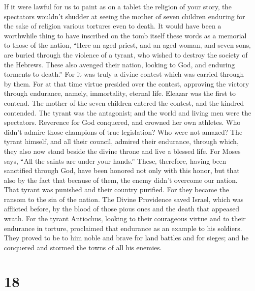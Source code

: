  If it were lawful for us to paint as on a tablet the
religion of your story, the spectators wouldn't shudder at seeing the
mother of seven children enduring for the sake of religion various
tortures even to death.  It would have been a worthwhile
thing to have inscribed on the tomb itself these words as a memorial to
those of the nation,  ``Here an aged priest, and an aged
woman, and seven sons, are buried through the violence of a tyrant, who
wished to destroy the society of the Hebrews.  These also
avenged their nation, looking to God, and enduring torments to death.''
 For it was truly a divine contest which was carried
through by them.  For at that time virtue presided over
the contest, approving the victory through endurance, namely,
immortality, eternal life.  Eleazar was the first to
contend. The mother of the seven children entered the contest, and the
kindred contended.  The tyrant was the antagonist; and
the world and living men were the spectators.  Reverence
for God conquered, and crowned her own athletes.  Who
didn't admire those champions of true legislation? Who were not amazed?
 The tyrant himself, and all their council, admired their
endurance,  through which, they also now stand beside the
divine throne and live a blessed life.  For Moses says,
``All the saints are under your hands.''  These,
therefore, having been sanctified through God, have been honored not
only with this honor, but that also by the fact that because of them,
the enemy didn't overcome our nation.  That tyrant was
punished and their country purified.  For they became the
ransom to the sin of the nation. The Divine Providence saved Israel,
which was afflicted before, by the blood of those pious ones and the
death that appeased wrath.  For the tyrant Antiochus,
looking to their courageous virtue and to their endurance in torture,
proclaimed that endurance as an example to his soldiers. 
They proved to be to him noble and brave for land battles and for
sieges; and he conquered and stormed the towns of all his enemies.

\hypertarget{section-17}{%
\section{18}\label{section-17}}

